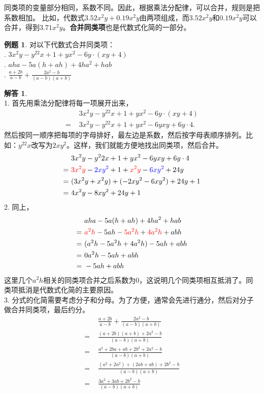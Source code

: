\documentclass[12pt,UTF8]{ctexbook}
\theoremstyle{definition}
\newtheorem{et}{例题}[section]
\newtheorem*{so}{解答}
\theoremstyle{plain}
\begin{document}
同类项的变量部分相同，系数不同。因此，根据乘法分配律，可以合并，规则是把系数相加。
比如，代数式$3.52x^2y + 0.19x^2y$由两项组成，而$3.52x^2y$和$0.19x^2y$可以合并，得到$3.71x^2y$。\textbf{合并同类项}也是代数式化简的一部分。
\begin{et}
    对以下代数式合并同类项：\\
    . $3x^2y - y^22x + 1 + yx^2 - 6y\cdot (xy + 4)$ \\
    . $aha - 5a(h + ah) + 4ha^2 + hab$ \\
    . $\frac{a + 2b}{a - b} + \frac{2a^2 - b}{(a - b)(a + b)}$ 
\end{et}
\begin{so}
    \mbox{}\\
    1. 首先用乘法分配律将每一项展开出来，
    \begin{align*}
             & 3x^2y - y^22x + 1 + yx^2 - 6y\cdot (xy + 4)  \\
        =\,\,& 3x^2y - y^22x + 1 + yx^2 - 6yxy + 6y\cdot 4. 
    \end{align*}
    然后按同一顺序把每项的字母排好，最左边是系数，然后按字母表顺序排列。比如：$y^22x$改写为$2xy^2$。这样，我们就能方便地找出同类项，然后合并。
    \begin{align*}
             &3x^2y - y^22x + 1 + yx^2 - 6yxy + 6y\cdot 4  \\
        =\,\,&{\color{red}3x^2y} - {\color{blue}2xy^2} + 1 + {\color{red}x^2y} - {\color{blue}6xy^2} + 24y  \\
        =\,\,&(3x^2y + x^2y) + (- 2xy^2 - 6xy^2) + 24y + 1  \\
        =\,\,&4x^2y - 8xy^2 + 24 y + 1 
    \end{align*}
    2. 同上，
    \begin{align*}
             & aha - 5a(h + ah) + 4ha^2 + hab  \\
        =\,\,& {\color{red}a^2h} - 5ah - {\color{red}5a^2h} + {\color{red}4a^2h} + abh  \\
        =\,\,& (a^2h  - 5a^2h + 4a^2h) - 5ah + abh  \\
        =\,\,& 0a^2h - 5ah + abh  \\
        =\,\,& - 5ah + abh  
    \end{align*}
    这里几个$a^2h$相关的同类项合并之后系数为$0$，这说明几个同类项相互抵消了。同类项抵消是代数式化简的主要原因。\\
    3. 分式的化简需要考虑分子和分母。为了方便，通常会先进行通分，然后对分子做合并同类项，最后约分。
    \begin{align*}
             & \frac{a + 2b}{a - b} + \frac{2a^2 - b}{(a - b)(a + b)}  \\
        =\,\,& \frac{(a + 2b)(a + b) + 2a^2 - b}{(a - b)(a + b)}  \\
        =\,\,& \frac{a^2 + 2ba + ab + 2b^2 + 2a^2 - b}{(a - b)(a + b)}  \\
        =\,\,& \frac{(a^2 + 2a^2) + (2ab + ab) + 2b^2 - b}{(a - b)(a + b)}  \\
        =\,\,& \frac{3a^2 + 3ab + 2b^2 - b}{(a - b)(a + b)}  
    \end{align*}
\end{so}
\end{document}
